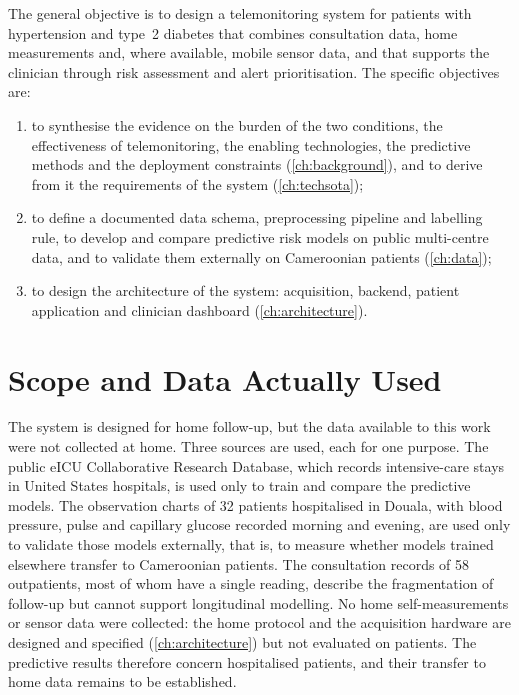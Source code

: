 The general objective is to design a telemonitoring system for patients with hypertension and type~2 diabetes that combines consultation data, home measurements and, where available, mobile sensor data, and that supports the clinician through risk assessment and alert prioritisation. The specific objectives are:
\begin{enumerate}[nosep]
  \item to synthesise the evidence on the burden of the two conditions, the effectiveness of telemonitoring, the enabling technologies, the predictive methods and the deployment constraints (\cref{ch:background}), and to derive from it the requirements of the system (\cref{ch:techsota});
  \item to define a documented data schema, preprocessing pipeline and labelling rule, to develop and compare predictive risk models on public multi-centre data, and to validate them externally on Cameroonian patients (\cref{ch:data});
  \item to design the architecture of the system: acquisition, backend, patient application and clinician dashboard (\cref{ch:architecture}).
\end{enumerate}

\section{Scope and Data Actually Used}\label{sec:intro-scope}

The system is designed for home follow-up, but the data available to this work were not collected at home. Three sources are used, each for one purpose. The public eICU Collaborative Research Database, which records intensive-care stays in United States hospitals, is used only to train and compare the predictive models. The observation charts of 32 patients hospitalised in Douala, with blood pressure, pulse and capillary glucose recorded morning and evening, are used only to validate those models externally, that is, to measure whether models trained elsewhere transfer to Cameroonian patients. The consultation records of 58 outpatients, most of whom have a single reading, describe the fragmentation of follow-up but cannot support longitudinal modelling. No home self-measurements or sensor data were collected: the home protocol and the acquisition hardware are designed and specified (\cref{ch:architecture}) but not evaluated on patients. The predictive results therefore concern hospitalised patients, and their transfer to home data remains to be established.

